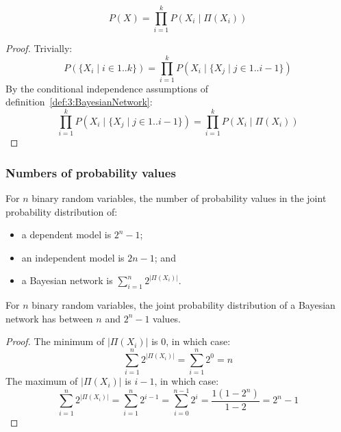 \begin{thm}
  \label{thm:3:BayesianNetworkJPD}
  \begin{equation}
    P(X) = \prod_{i = 1}^{k} P(X_i \mid \Pi(X_i))
  \end{equation}
  \begin{proof}
    Trivially:
    \begin{equation}
      P(\{ X_i \mid i \in 1 .. k \})
      = \prod_{i = 1}^{k} P(X_i \mid \{ X_j \mid j \in 1 .. i - 1 \})
    \end{equation}
    By the conditional independence assumptions of
    definition~\ref{def:3:BayesianNetwork}:
    \begin{equation}
      \prod_{i = 1}^{k} P(X_i \mid \{ X_j \mid j \in 1 .. i - 1 \})
      = \prod_{i = 1}^{k} P(X_i \mid \Pi(X_i))
    \end{equation}
  \end{proof}
\end{thm}

\subsubsection{Numbers of probability values}

For $n$ binary random variables, the number of probability values in the joint
probability distribution of:
\begin{itemize}
  \item a dependent model is $2^n - 1$;
  \item an independent model is $2n - 1$; and
  \item a Bayesian network is $\sum_{i = 1}^{n} 2^{|\Pi(X_i)|}$.
\end{itemize}

\begin{thm}
  For $n$ binary random variables, the joint probability distribution of a
  Bayesian network has between $n$ and $2^n - 1$ values.
  \begin{proof}
    The minimum of $|\Pi(X_i)|$ is 0, in which case:
    \begin{equation}
      \sum_{i = 1}^{n} 2^{|\Pi(X_i)|} = \sum_{i = 1}^{n} 2^0 = n
    \end{equation}
    The maximum of $|\Pi(X_i)|$ is $i - 1$, in which case:
    \begin{equation}
      \sum_{i = 1}^{n} 2^{|\Pi(X_i)|}
      = \sum_{i = 1}^{n} 2^{i - 1}
      = \sum_{i = 0}^{n - 1} 2^i
      = \frac{1 (1 - 2^n)}{1 - 2}
      = 2^n - 1
    \end{equation}
  \end{proof}
\end{thm}

